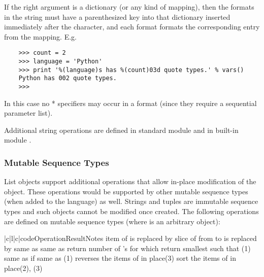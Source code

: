 If the right argument is a dictionary (or any kind of mapping), then
the formats in the string must have a parenthesized key into that
dictionary inserted immediately after the \code{\%} character, and
each format formats the corresponding entry from the mapping.  E.g.
\begin{verbatim}
    >>> count = 2
    >>> language = 'Python'
    >>> print '%(language)s has %(count)03d quote types.' % vars()
    Python has 002 quote types.
    >>> 
\end{verbatim}
In this case no * specifiers may occur in a format (since they
require a sequential parameter list).

Additional string operations are defined in standard module
 and in built-in module .

\subsubsection{Mutable Sequence Types}

List objects support additional operations that allow in-place
modification of the object.
These operations would be supported by other mutable sequence types
(when added to the language) as well.
Strings and tuples are immutable sequence types and such objects cannot
be modified once created.
The following operations are defined on mutable sequence types (where
 is an arbitrary object):

\begin{tableiii}{|c|l|c|}{code}{Operation}{Result}{Notes}
	{item  of  is replaced by }{}
  	{slice of  from  to  is replaced by }{}
	{same as }{}
	{same as }{}
	{return number of 's for which }{}
	{return smallest  such that }{(1)}
	{same as 
	  if }{}
	{same as }{(1)}
	{reverses the items of  in place}{(3)}
	{sort the items of  in place}{(2), (3)}
\end{tableiii}
\renewcommand{\indexsubitem}{(list method)}

